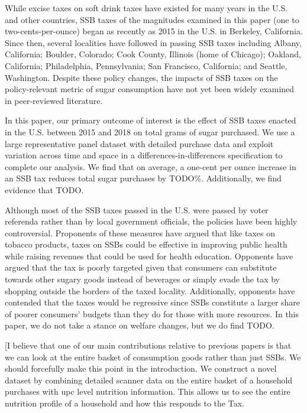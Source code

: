 \documentclass[12pt]{article}
\begin{document}
While excise taxes on soft drink taxes have existed for many years in the U.S. and other countries, SSB taxes of the magnitudes examined in this paper (one to two-cents-per-ounce) began as recently as 2015 in the U.S. in Berkeley, California. Since then, several localities have followed in passing SSB taxes including Albany, California; Boulder, Colorado; Cook County, Illinois (home of Chicago); Oakland, California; Philadelphia, Pennsylvania; San Francisco, California; and Seattle, Washington. Despite these policy changes, the impacts of SSB taxes on the policy-relevant metric of sugar consumption have not yet been widely examined in peer-reviewed literature.

In this paper, our primary outcome of interest is the effect of SSB taxes enacted in the U.S. between 2015 and 2018 on total grams of sugar purchased. We use a large representative panel dataset with detailed purchase data and exploit variation across time and space in a differences-in-differences specification to complete our analysis. We find that on average, a one-cent per ounce increase in an SSB tax reduces total sugar purchases by TODO\%. Additionally, we find evidence that TODO.

Although most of the SSB taxes passed in the U.S. were passed by voter referenda rather than by local government officials, the policies have been highly controversial. Proponents of these measures have argued that like taxes on tobacco products, taxes on SSBs could be effective in improving public health while raising revenues that could be used for health education. Opponents have argued that the tax is poorly targeted given that consumers can substitute towards other sugary goods instead of beverages or simply evade the tax by shopping outside the borders of the taxed locality. Additionally, opponents have contended that the taxes would be regressive since SSBs constitute a larger share of poorer consumers' budgets than they do for those with more resources. In this paper, we do not take a stance on welfare changes, but we do find TODO.

[I believe that one of our main contributions relative to previous papers is that we can look at the entire basket of consumption goods rather than just SSBs. We should forcefully make this point in the introduction. We construct a novel dataset by combining detailed scanner data on the entire basket of a household purchases with upc level nutrition information. This allows us to see the entire nutrition profile of a household and how this responds to the Tax.
\end{document}
